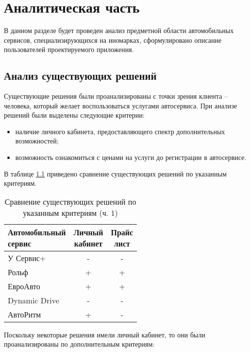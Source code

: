 \chapter{Аналитическая часть}

В данном разделе будет проведен анализ предметной области автомобильных сервисов, специализирующихся на иномарках, сформулировано описание пользователей проектируемого приложения.

\section{Анализ существующих решений}

Существующие решения были проанализированы с точки зрения клиента -- человека, который желает воспользоваться услугами автосервиса. При анализе решений были выделены следующие критерии:

\begin{itemize}
	\item наличие личного кабинета, предоставляющего спектр дополнительных возможностей;
	\item возможность ознакомиться с ценами на услуги до регистрации в автосервисе.
\end{itemize}

В таблице \ref{tab:compare1} приведено сравнение существующих решений по указанным критериям.

\begin{table}[H]
	\centering
	\caption{\label{tab:compare1}Сравнение существующих решений по указанным критериям (ч. 1)}
	\begin{tabular}{|l|c|c|}
		\hline \specialcell{Автомобильный\\сервис} & \specialcell{Личный\\кабинет} &
		\specialcell{Прайс\\лист} \\\hline
		У Сервис+ \cite{serv1} & - & - \\\hline
		Рольф\cite{serv2} & + & + \\\hline
		ЕвроАвто\cite{serv3} & + & + \\\hline
		Dynamic Drive\cite{serv4} & - & - \\\hline
		АвтоРитм\cite{serv5} & + & - \\\hline
	\end{tabular}
\end{table}

Поскольку некоторые решения имели личный кабинет, то они были проанализированы по дополнительным критериям:

